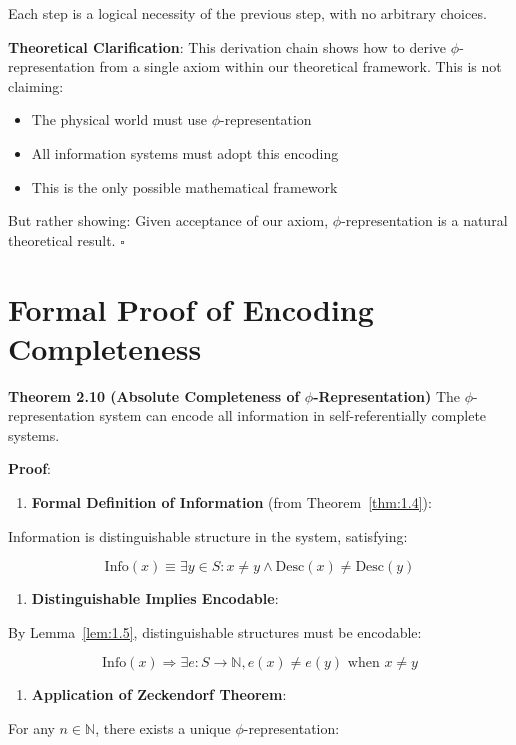 Each step is a logical necessity of the previous step, with no arbitrary choices.

\textbf{Theoretical Clarification}: This derivation chain shows how to derive $\phi$-representation from a single axiom within our theoretical framework. This is not claiming:
\begin{itemize}
\item The physical world must use $\phi$-representation
\item All information systems must adopt this encoding
\item This is the only possible mathematical framework
\end{itemize}

But rather showing: Given acceptance of our axiom, $\phi$-representation is a natural theoretical result. $\square$

\section{Formal Proof of Encoding Completeness}
\label{sec:ch02_encoding:formal-proof-of-encoding-completeness}

\textbf{Theorem 2.10 (Absolute Completeness of $\phi$-Representation)}
\label{thm:2.10}
The $\phi$-representation system can encode all information in self-referentially complete systems.

\textbf{Proof}:

\begin{enumerate}
\item \textbf{Formal Definition of Information} (from Theorem~\ref{thm:1.4}):
\end{enumerate}
   Information is distinguishable structure in the system, satisfying:
   
\begin{equation}
\text{Info}(x) \equiv \exists y \in S: x \neq y \land \text{Desc}(x) \neq \text{Desc}(y)
\end{equation}
\begin{enumerate}
\item \textbf{Distinguishable Implies Encodable}:
\end{enumerate}
   By Lemma~\ref{lem:1.5}, distinguishable structures must be encodable:
   
\begin{equation}
\text{Info}(x) \Rightarrow \exists e: S \to \mathbb{N}, e(x) \neq e(y) \text{ when } x \neq y
\end{equation}
\begin{enumerate}
\item \textbf{Application of Zeckendorf Theorem}:
\end{enumerate}
   For any $n \in \mathbb{N}$, there exists a unique $\phi$-representation:
   
